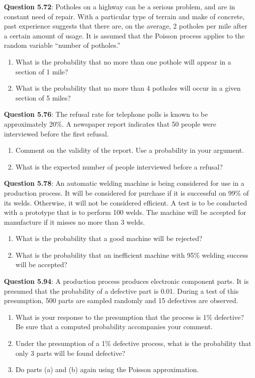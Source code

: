\documentclass{article}
\begin{document}
    \textbf{Question 5.72}:  Potholes on a highway can be a serious problem,
    and are in constant need of repair. With a particular
    type of terrain and make of concrete, past experience
    suggests that there are, on the average, 2 potholes per
    mile after a certain amount of usage. It is assumed
    that the Poisson process applies to the random variable 
    “number of potholes.”
        \begin{enumerate}[label = (\alph*)]
            \item What is the probability that no more than one pothole 
            will appear in a section of 1 mile?
            \item What is the probability that no more than 4 potholes 
            will occur in a given section of 5 miles?
        \end{enumerate}
    \textbf{Question 5.76}: The refusal rate for telephone polls is known to
    be approximately 20\%. A newspaper report indicates
    that 50 people were interviewed before the first refusal.
        \begin{enumerate}[label = (\alph*)]
            \item Comment on the validity of the report. Use a probability 
            in your argument.
            \item What is the expected number of people interviewed
            before a refusal?
        \end{enumerate}
    \textbf{Question 5.78}: An automatic welding machine is being considered
    for use in a production process. It will be considered 
    for purchase if it is successful on 99\% of its welds. 
    Otherwise, it will not be considered efficient.
    A test is to be conducted with a prototype that is to
    perform 100 welds. The machine will be accepted for
    manufacture if it misses no more than 3 welds.
        \begin{enumerate}[label = (\alph*)]
            \item What is the probability that a good machine will
            be rejected?
            \item What is the probability that an inefficient machine
            with 95\% welding success will be accepted?
        \end{enumerate}
    \textbf{Question 5.94}: A production process produces electronic component 
    parts. It is presumed that the probability of a
    defective part is 0.01. During a test of this presumption, 
    500 parts are sampled randomly and 15 defectives
    are observed.
        \begin{enumerate}[label = (\alph*)]
            \item What is your response to the presumption that the
            process is 1\% defective? Be sure that a computed
            probability accompanies your comment.
            \item Under the presumption of a 1\% defective process,
            what is the probability that only 3 parts will be
            found defective?
            \item Do parts (a) and (b) again using the Poisson approximation.
        \end{enumerate}
\end{document}
